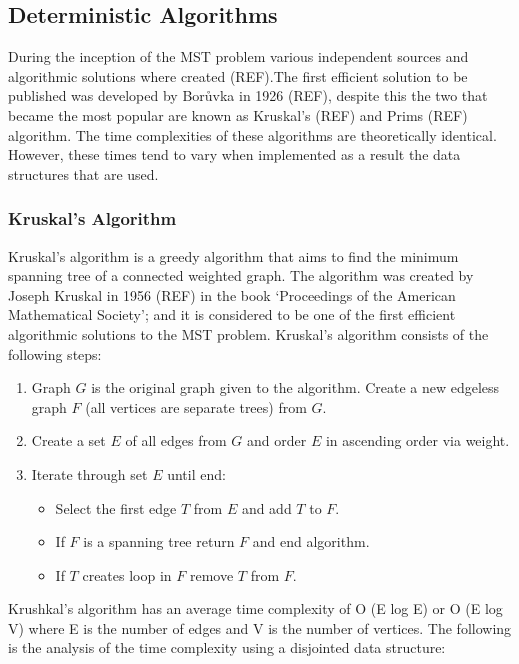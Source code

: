\documentclass{AISB2008}
\begin{document}
\subsection{Deterministic Algorithms}

During the inception of the MST problem various independent sources and algorithmic solutions where created (REF).The first efficient solution to be published was developed by Borůvka in 1926 (REF), despite this the two that became the most popular are known as Kruskal’s (REF) and Prims (REF) algorithm. The time complexities of these algorithms are theoretically identical. However, these times tend to vary when implemented as a result the data structures that are used.


\subsubsection{Kruskal's Algorithm}

Kruskal’s algorithm is a greedy algorithm that aims to find the minimum spanning tree of a connected weighted graph. The algorithm was created by Joseph Kruskal in 1956 (REF) in the book ‘Proceedings of the American Mathematical Society’; and it is considered to be one of the first efficient algorithmic solutions to the MST problem.
Kruskal’s algorithm consists of the following steps:

\begin{enumerate}
\item Graph {$G$} is the original graph given to the algorithm. Create a new edgeless graph {$F$} (all vertices are separate trees) from {$G$}.
\item Create a set {$E$} of all edges from {$G$} and order {$E$} in ascending order via weight.
\item Iterate through set {$E$} until end:
\begin{itemize}
\item Select the first edge {$T$} from {$E$} and add {$T$} to {$F$}.
\item If {$F$} is a spanning tree return {$F$} and end algorithm.
\item If {$T$} creates loop in {$F$} remove {$T$} from {$F$}.
\end{itemize}
\end{enumerate}

Krushkal’s algorithm has an average time complexity of O (E log E) or O (E log V) where E is the number of edges and V is the number of vertices. The following is the analysis of the time complexity using a disjointed data structure:
\end{document}
